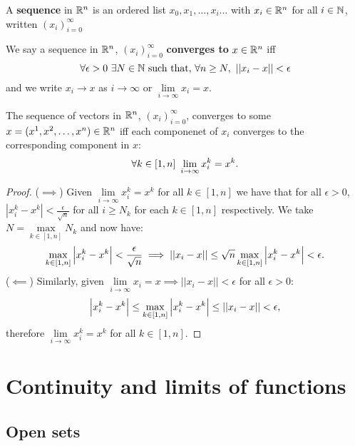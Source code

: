 \documentclass[../Year2.tex]{subfiles}
\begin{document}
\begin{definition}
    A \textbf{sequence} in $\mathbb{R}^n$ is an ordered list $x_0,x_1,\ldots,x_i\ldots$ with $x_i\in\mathbb{R}^n$ for all $i\in\mathbb{N}$, written ${(x_i)}_{i=0}^\infty$
\end{definition}

\begin{definition}
    We say a sequence in $\mathbb{R}^n$,  ${(x_i)}_{i=0}^\infty$ \textbf{converges to} $x\in\mathbb{R}^n$ iff \[
        \forall\epsilon>0 \ \exists N\in\NN \ \black{such that, } \forall n\geq N, \ ||x_i-x||<\epsilon
    \] and we write $x_i\rightarrow x$ as $i\rightarrow\infty$ or $\lim\limits_{i\rightarrow\infty}x_i=x$.
\end{definition}

\begin{lemma}
    The sequence of vectors in $\mathbb{R}^n$, ${(x_i)}_{i=0}^\infty$, converges to some $x=(x^1,x^2,\ldots,x^n)\in\mathbb{R}^n$ iff each componenet of $x_i$ converges to the corresponding component in $x$: \[
        \forall k\in[1,n] \ \lim_{i\rightarrow\infty}x_i^k=x^k\black{.}
    \]
    \vspace{-20pt}
    \begin{proof}
        ($\implies$) Given $\displaystyle \lim\limits_{i\rightarrow\infty}x_i^k=x^k$ for all $k\in[1,n]$ we have that for all $\epsilon>0$, $\displaystyle\left|x_i^k-x^k\right|<\frac{\epsilon}{\sqrt{n}}$ for all $i\geq N_k$ for each $k\in[1,n]$ respectively. We take $N=\max\limits_{k\in[1,n]}N_k$ and now have: \vspace{-10pt}\[
            \max_{k\in[1,n]}\left|x_i^k-x^k\right|<\frac{\epsilon}{\sqrt{n}} \implies ||x_i-x||\leq\sqrt{n}\max_{k\in[1,n]}\left|x_i^k-x^k\right|<\epsilon\text{\textcolor{black}{.}}
        \]($\impliedby$)
    Similarly, given $\lim\limits_{i\rightarrow\infty}x_i=x \implies ||x_i-x||<\epsilon$ for all $\epsilon>0$: \[
        \left|x_i^k-x^k\right|\leq\max_{k\in[1,n]}\left|x_i^k-x^k\right|\leq||x_i-x||<\epsilon\text{\textcolor{black}{,}}
    \] therefore $\displaystyle \lim\limits_{i\rightarrow\infty}x_i^k=x^k$ for all $k\in[1,n]$.
    \end{proof}
\end{lemma}

\section{Continuity and limits of functions}

\subsection{Open sets}
\end{document}
